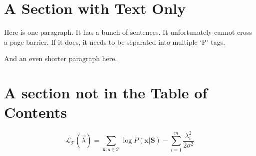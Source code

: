 \documentclass{article}
\begin{document}
\newpage

\section[Short Title]{A Section with Text Only}

Here is one paragraph. It has a bunch of sentences. It unfortunately cannot cross a page barrier. If it does, it needs to be separated into multiple `P' tags.
\CloseMc{}

And an even shorter paragraph here.
\CloseMc

\section*{A section not in the Table of Contents}

\begin{equation} \textstyle
  \mathcal{L}_{\mathcal{T}}(\vec{\lambda}) = \sum_{\mathbf{x},\mathbf{s}\in\mathcal{T}} \log P(\mathbf{x}|\mathbf{S}) - \sum_{i=1}^m \frac{\lambda_i^2}{2\sigma^2}
\end{equation}


%
%
%
%
%
%
\end{document}

